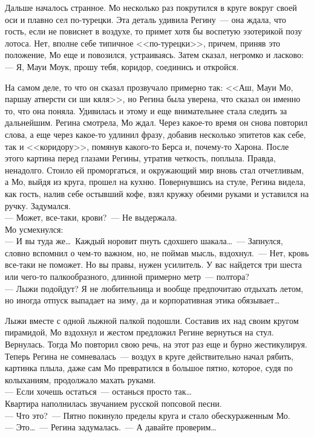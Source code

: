 Дальше началось странное. Мо несколько раз покрутился в круге вокруг своей оси 
и 
плавно сел по-турецки. Эта деталь удивила Регину~--- она ждала, что гость, если 
не 
повиснет в воздухе, то примет хотя бы воспетую эзотерикой позу лотоса. Нет, 
вполне себе типичное <<по-турецки>>, причем, приняв это положение, Мо еще и 
повозился, устраиваясь. Затем сказал, негромко и ласково:\\
--- Я, Мауи Моук, прошу тебя, коридор, соединись и откройся.

На самом деле, то что он сказал прозвучало примерно так: <<Аш, Мауи Мо, паршау 
атверсти си ши кяля>>, но Регина была уверена, что сказал он именно то, что она 
поняла. Удивилась и этому и еще внимательнее стала следить за дальнейшим. 
Регина 
смотрела, Мо ждал. Через какое-то время он снова повторил слова, а еще через 
какое-то удлинил фразу, добавив несколько эпитетов как себе, так и 
<<коридору>>, 
помянув какого-то Берса и, почему-то Харона. После этого картина перед глазами 
Регины, утратив четкость, поплыла. Правда, ненадолго. Стоило ей проморгаться, и 
окружающий мир вновь стал отчетливым, а Мо, выйдя из круга, прошел на кухню. 
Повернувшись на стуле, Регина видела, как гость, налив себе остывший кофе, взял 
кружку обеими руками и уставился на ручку. Задумался.\\
--- Может, все-таки, крови?~--- Не выдержала.\\
Мо усмехнулся:\\
--- И вы туда же\ldots\ Каждый норовит пнуть сдохшего шакала\ldots~--- 
Запнулся, словно 
вспомнил о чем-то важном, но, не поймав мысль, вздохнул.~--- Нет, кровь 
все-таки 
не поможет. Но вы правы, нужен усилитель. У вас найдется три шеста или чего-то 
палкообразного, длинной примерно метр~--- полтора?\\
--- Лыжи подойдут? Я не любительница и вообще предпочитаю отдыхать летом, но 
иногда отпуск выпадает на зиму, да и корпоративная этика обязывает\ldots

Лыжи вместе с одной лыжной палкой подошли. Составив их над своим кругом 
пирамидой, Мо вздохнул и жестом предложил Регине вернуться на стул. Вернулась. 
Тогда Мо повторил свою речь, на этот раз еще и бурно жестикулируя. Теперь 
Регина 
не сомневалась~--- воздух в круге действительно начал рябить, картинка плыла, 
даже 
сам Мо превратился в большое пятно, которое, судя по колыханиям, продолжало 
махать руками.\\
--- Если хочешь остаться~--- останься просто так\ldots\\
Квартира наполнилась звучанием русской попсовой песни.\\
--- Что это?~--- Пятно покинуло пределы круга и стало обескураженным 
Мо.\\
--- Это\ldots~--- Регина задумалась.~--- А давайте проверим\ldots

